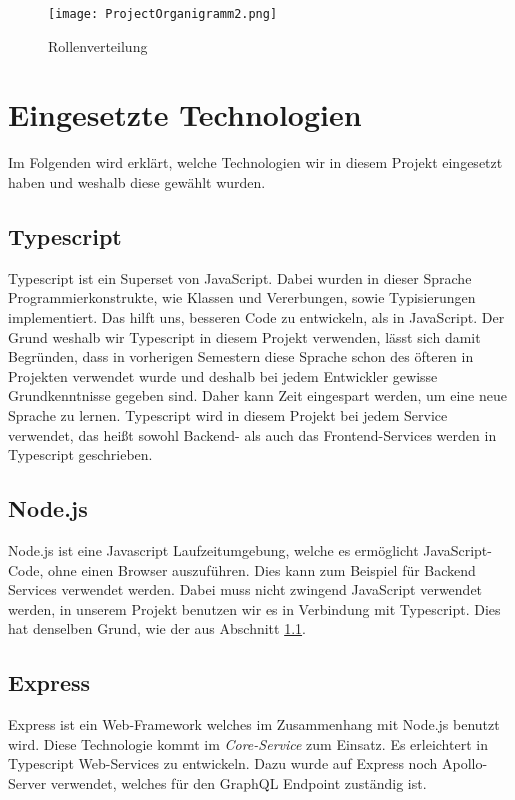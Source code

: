     \begin{figure}[!hbt]
        \texttt{[image: ProjectOrganigramm2.png]}
        \caption{Rollenverteilung}
        \label{fig:Rollenverteilung}
    \end{figure}
    
\section{Eingesetzte Technologien}
Im Folgenden wird erklärt, welche Technologien wir in diesem Projekt eingesetzt haben und weshalb diese gewählt wurden.

\subsection{Typescript} \label{sub:Typescript}
    Typescript ist ein Superset von JavaScript. Dabei wurden in dieser Sprache Programmierkonstrukte, wie Klassen und Vererbungen, sowie Typisierungen implementiert. Das hilft uns, besseren Code zu entwickeln, als in JavaScript.
    Der Grund weshalb wir Typescript in diesem Projekt verwenden, lässt sich damit Begründen, dass in vorherigen Semestern diese Sprache schon des öfteren in Projekten verwendet wurde und deshalb bei jedem Entwickler gewisse Grundkenntnisse
    gegeben sind. Daher kann Zeit eingespart werden, um eine neue Sprache zu lernen. Typescript wird in diesem Projekt bei jedem Service verwendet, das heißt sowohl Backend- als auch das Frontend-Services werden in Typescript geschrieben.
\subsection{Node.js}
    Node.js ist eine Javascript Laufzeitumgebung, welche es ermöglicht JavaScript-Code, ohne einen Browser auszuführen. Dies kann zum Beispiel für Backend Services verwendet werden. Dabei muss nicht zwingend JavaScript verwendet werden,
    in unserem Projekt benutzen wir es in Verbindung mit Typescript. Dies hat denselben Grund, wie der aus Abschnitt \ref{sub:Typescript}.
\subsection{Express}
    Express ist ein Web-Framework welches im Zusammenhang mit Node.js benutzt wird. Diese Technologie kommt im \textit{Core-Service} zum Einsatz. Es erleichtert in Typescript Web-Services zu entwickeln.
    Dazu wurde auf Express noch Apollo-Server verwendet, welches für den GraphQL Endpoint zuständig ist.
